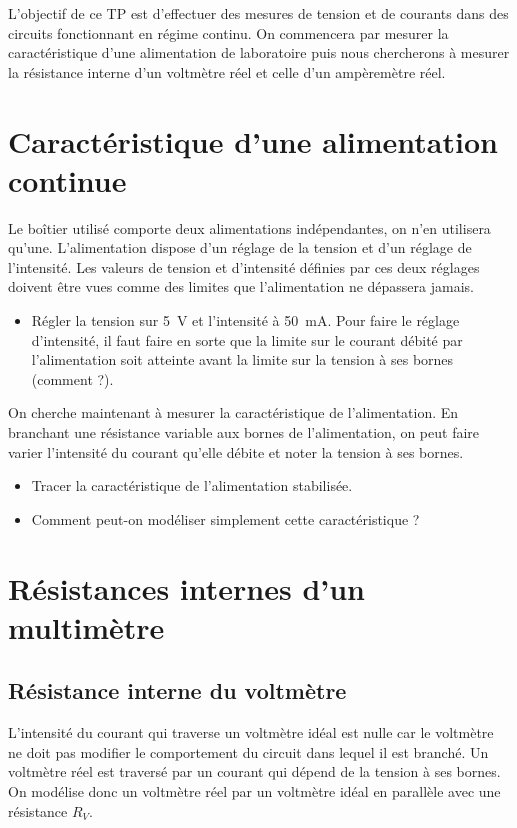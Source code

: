 \documentclass[]{tp}
\begin{document}

L'objectif de ce TP est d'effectuer des mesures de tension et de courants dans des circuits fonctionnant en régime continu. On commencera par mesurer la caractéristique d'une alimentation de laboratoire puis nous chercherons à mesurer la résistance interne d'un voltmètre réel et celle d'un ampèremètre réel.

\section{Caractéristique d'une alimentation continue}
\label{sec:carac_alim_continue}

Le boîtier utilisé comporte deux alimentations indépendantes, on n'en utilisera qu'une. L'alimentation dispose d'un réglage de la tension et d'un réglage de l'intensité. Les valeurs de tension et d'intensité définies par ces deux réglages doivent être vues comme des limites que l'alimentation ne dépassera jamais. 

\begin{itemize}
  \item Régler la tension sur \SI{5}{V} et l'intensité à \SI{50}{mA}. Pour faire le réglage d'intensité, il faut faire en sorte que la limite sur le courant débité par l'alimentation soit atteinte avant la limite sur la tension à ses bornes (comment ?). 
\end{itemize}

On cherche maintenant à mesurer la caractéristique de l'alimentation. En branchant une résistance variable aux bornes de l'alimentation, on peut faire varier l'intensité du courant qu'elle débite et noter la tension à ses bornes.

\begin{itemize}
  \item Tracer la caractéristique de l'alimentation stabilisée. 
  \item Comment peut-on modéliser simplement cette caractéristique ?
\end{itemize}

\section{Résistances internes d'un multimètre}

\subsection{Résistance interne du voltmètre}%
\label{sub:resistance_d_entree_du_voltmetre}
L'intensité du courant qui traverse un voltmètre idéal est nulle car le voltmètre ne doit pas modifier le comportement du circuit dans lequel il est branché. Un voltmètre réel est traversé par un courant qui dépend de la tension à ses bornes. On modélise donc un voltmètre réel par un voltmètre idéal en parallèle avec une résistance $R_V$.
\end{document}
